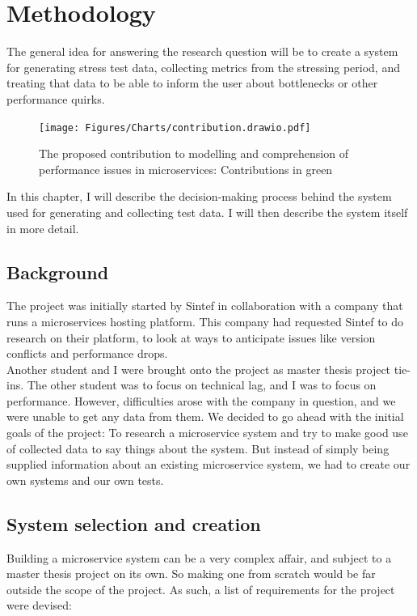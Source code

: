 \chapter{Methodology}

The general idea for answering the research question will be to create a system for generating stress test data, collecting metrics from the stressing period, and treating that data to be able to inform the user about bottlenecks or other performance quirks.

\begin{figure}[ht]
    \centering
    \texttt{[image: Figures/Charts/contribution.drawio.pdf]}
    \caption{The proposed contribution to modelling and comprehension of performance issues in microservices: Contributions in green}
    \label{Contributions}
\end{figure}

In this chapter, I will describe the decision-making process behind the system used for generating and collecting test data. I will then describe the system itself in more detail.

\section{Background}
The project was initially started by Sintef in collaboration with a company that runs a microservices hosting platform. This company had requested Sintef to do research on their platform, to look at ways to anticipate issues like version conflicts and performance drops. \\
Another student and I were brought onto the project as master thesis project tie-ins. The other student was to focus on technical lag, and I was to focus on performance. However, difficulties arose with the company in question, and we were unable to get any data from them.
We decided to go ahead with the initial goals of the project: To research a microservice system and try to make good use of collected data to say things about the system.
But instead of simply being supplied information about an existing microservice system, we had to create our own systems and our own tests.

\section{System selection and creation}
Building a microservice system can be a very complex affair, and subject to a master thesis project on its own. So making one from scratch would be far outside the scope of the project. As such, a list of requirements for the project were devised:

